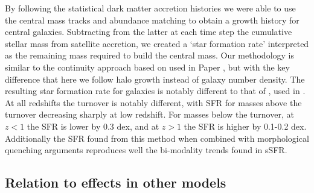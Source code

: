 By following the statistical dark matter accretion histories we were able to use the central mass tracks and abundance matching to obtain a growth history for central galaxies. Subtracting from the latter at each time step the cumulative stellar mass from satellite accretion, we created a `star formation rate' interpreted as the remaining mass required to build the central mass. Our methodology is similar to the continuity approach based on \citet{Leja2015ReconcilingFunction} used in Paper , but with the key difference that here we follow halo growth instead of galaxy number density. 
The resulting star formation rate for galaxies is notably different to that of \citet{Tomczak2014GALAXY}, used in \citet{Grylls2019PredictingSteel.}. At all redshifts the turnover is notably different, with SFR for masses above the turnover decreasing sharply at low redshift. For masses below the turnover, at $z < 1$ the SFR is lower by 0.3 dex, and at $z > 1$ the SFR is higher by 0.1-0.2 dex. Additionally the SFR found from this method when combined with morphological quenching arguments reproduces well the bi-modality trends found in sSFR.

\subsection{Relation to effects in other models}

